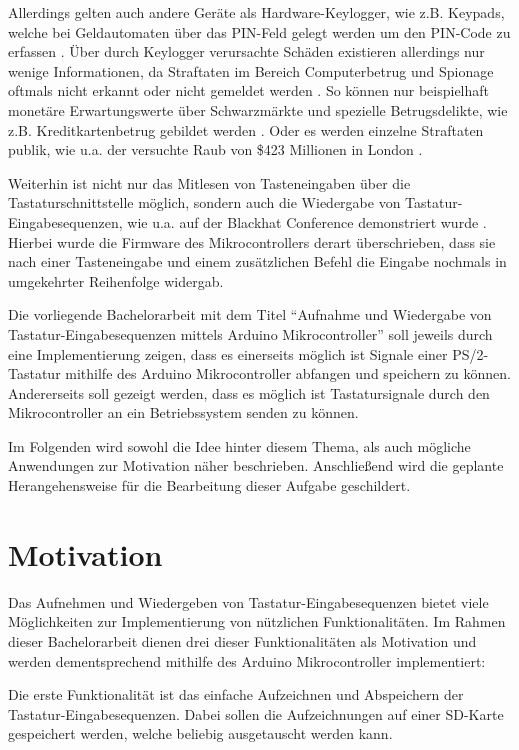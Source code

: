 Allerdings gelten auch andere Geräte als Hardware-Keylogger, wie z.B. Keypads, welche bei Geldautomaten über das PIN-Feld gelegt werden um den PIN-Code zu erfassen \cite{kirk}. Über durch Keylogger verursachte Schäden existieren allerdings nur wenige Informationen, da Straftaten im Bereich Computerbetrug und Spionage oftmals nicht erkannt oder nicht gemeldet werden \cite{bundeskriminalamt}. So können nur beispielhaft monetäre Erwartungswerte über Schwarzmärkte und spezielle Betrugsdelikte, wie z.B. Kreditkartenbetrug gebildet werden \cite{holz}. Oder es werden einzelne Straftaten publik, wie u.a. der versuchte Raub von \$423 Millionen in London \cite{keizer}.

Weiterhin ist nicht nur das Mitlesen von Tasteneingaben über die Tastaturschnittstelle möglich, sondern auch die Wiedergabe von Tastatur-Eingabesequenzen, wie u.a. auf der Blackhat Conference demonstriert wurde \cite{chen}. Hierbei wurde die Firmware des Mikrocontrollers derart überschrieben, dass sie nach einer Tasteneingabe und einem zusätzlichen Befehl die Eingabe nochmals in umgekehrter Reihenfolge widergab.

Die vorliegende Bachelorarbeit mit dem Titel ``Aufnahme und Wiedergabe von Tastatur-Eingabesequenzen mittels Arduino Mikrocontroller'' soll jeweils durch eine Implementierung zeigen, dass es einerseits möglich ist Signale einer PS/2-Tastatur mithilfe des Arduino Mikrocontroller \cite{arduino} abfangen und speichern zu können. Andererseits soll gezeigt werden, dass es möglich ist Tastatursignale durch den Mikrocontroller an ein Betriebssystem senden zu können.

Im Folgenden wird sowohl die Idee hinter diesem Thema, als auch mögliche Anwendungen zur Motivation näher beschrieben. Anschließend wird die geplante Herangehensweise für die Bearbeitung dieser Aufgabe geschildert.



\section{Motivation}
Das Aufnehmen und Wiedergeben von Tastatur-Eingabesequenzen bietet viele Möglichkeiten zur Implementierung von nützlichen Funktionalitäten. Im Rahmen dieser Bachelorarbeit dienen drei dieser Funktionalitäten als Motivation und werden dementsprechend mithilfe des Arduino Mikrocontroller \cite{arduino} implementiert:

Die erste Funktionalität ist das einfache Aufzeichnen und Abspeichern der Tastatur-Eingabesequenzen. Dabei sollen die Aufzeichnungen auf einer SD-Karte gespeichert werden, welche beliebig ausgetauscht werden kann.

